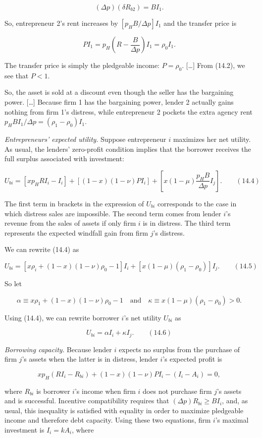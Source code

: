 \documentclass[11pt,a4paper]{article}
\begin{document}
\[(\Delta p)(\delta R_{b2}) = BI_1.\]

So, entrepreneur 2's rent increases by \([p_H B/\Delta p]I_1\) and the transfer price is

\[PI_1 = p_H\left(R - \frac{B}{\Delta p}\right)I_1 = \rho_0 I_1.\]

The transfer price is simply the pledgeable income: \(P = \rho_0\). {[}\ldots{]} From (14.2), we see
that \(P < 1\).

So, the asset is sold at a discount even though the seller has the bargaining power. {[}\ldots{]}
Because firm 1 has the bargaining power, lender 2 actually gains nothing from firm 1's distress,
while entrepreneur 2 pockets the extra agency rent \(p_H BI_1/\Delta p = (\rho_1 - \rho_0)I_1\).

\emph{Entrepreneurs' expected utility.} Suppose entrepreneur \(i\) maximizes her net utility. As
usual, the lenders' zero-profit condition implies that the borrower receives the full surplus
associated with investment:

\[U_{bi} = [xp_H RI_i - I_i] + [(1 - x)(1 - \nu)PI_i] + \left[x(1 - \mu)\frac{p_H B}{\Delta p}I_j\right]. \qquad (14.4)\]

The first term in brackets in the expression of \(U_{bi}\) corresponds to the case in which distress
sales are impossible. The second term comes from lender \(i\)'s revenue from the sales of assets if
only firm \(i\) is in distress. The third term represents the expected windfall gain from firm
\(j\)'s distress.

We can rewrite (14.4) as

\[U_{bi} = [x\rho_i + (1 - x)(1 - \nu)\rho_0 - 1]I_i + [x(1 - \mu)(\rho_1 - \rho_0)]I_j. \qquad (14.5)\]

So let

\[\alpha \equiv x\rho_1 + (1 - x)(1 - \nu)\rho_0 - 1 \quad\text{and}\quad \kappa \equiv x(1 - \mu)(\rho_1 - \rho_0) > 0.\]

Using (14.4), we can rewrite borrower \(i\)'s net utility \(U_{bi}\) as

\[U_{bi} = \alpha I_i + \kappa I_j. \qquad (14.6)\]

\emph{Borrowing capacity.} Because lender \(i\) expects no surplus from the purchase of firm \(j\)'s
assets when the latter is in distress, lender \(i\)'s expected profit is

\[xp_H(RI_i - R_{bi}) + (1 - x)(1 - \nu)PI_i - (I_i - A_i) = 0,\]

where \(R_{bi}\) is borrower \(i\)'s income when firm \(i\) does not purchase firm \(j\)'s assets
and is successful. Incentive compatibility requires that \((\Delta p)R_{bi} \geqslant BI_i\), and,
as usual, this inequality is satisfied with equality in order to maximize pledgeable income and
therefore debt capacity. Using these two equations, firm \(i\)'s maximal investment is
\(I_i = kA_i\), where
\end{document}
